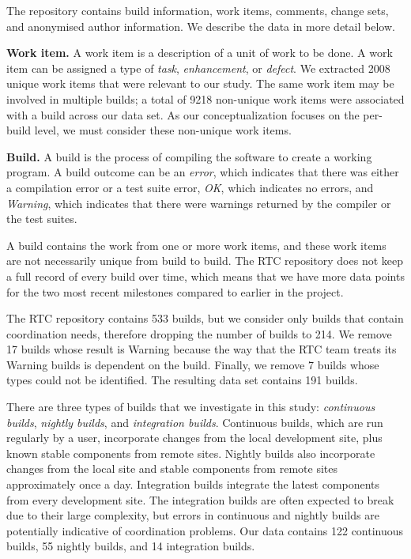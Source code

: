 The repository contains build information, work items, comments, change sets, and anonymised author information. We describe the data in more detail below.

\textbf{Work item.} A work item is a description of a unit of work to be done. A work item can be assigned a type of \emph{task}, \emph{enhancement}, or \emph{defect}.
We extracted 2008 unique work items that were relevant to our study.
The same work item may be involved in multiple builds; a total of 9218 non-unique work items were associated with a build across our data set. As our conceptualization focuses on the per-build level, we must consider these non-unique work items.

\textbf{Build.} A build is the process of compiling the software to create a working program.
A build outcome can be an \emph{error}, which indicates that there was either a
compilation error or a test suite error, \emph{OK}, which indicates no
errors, and \emph{Warning}, which indicates that there were warnings
returned by the compiler or the test suites.

A build contains the work from one or more work items, and these work items are not necessarily unique from build to build. The RTC repository does not keep a full record of every build over time, which means that we have more data points for the two most recent milestones compared to earlier in the project.

The RTC repository contains 533 builds, but we consider only builds that contain coordination needs, therefore dropping the number of builds to 214.  We remove 17 builds whose result is Warning because the way that the RTC team treats its Warning builds is dependent on the build. Finally, we remove 7 builds whose types could not be identified. The resulting data set contains 191 builds.

There are three types of builds that we investigate in this study: \emph{continuous builds}, \emph{nightly builds}, and \emph{integration builds}. Continuous builds, which are run regularly by a user, incorporate changes from the local development site, plus known stable components from remote sites.  Nightly builds also incorporate changes from the local site and stable components from remote sites approximately once a day. Integration builds integrate the latest components from every development site. The integration builds are often expected to break due to their large complexity, but errors in continuous and nightly builds are potentially indicative of coordination problems. Our data contains 122 continuous builds, 55 nightly builds, and 14 integration builds.

